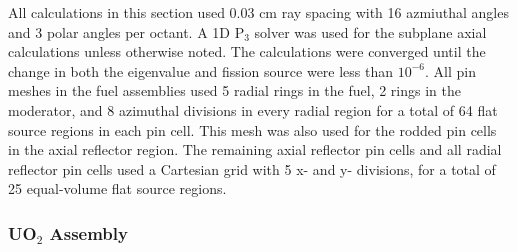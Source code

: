 All calculations in this section used 0.03 cm ray spacing with 16 azmiuthal angles and 3 polar angles per octant.  A 1D P$_3$ solver was used for the subplane axial calculations unless otherwise noted.  The calculations were converged until the change in both the eigenvalue and fission source were less than $10^{-6}$.  All pin meshes in the fuel assemblies used 5 radial rings in the fuel, 2 rings in the moderator, and 8 azimuthal divisions in every radial region for a total of 64 flat source regions in each pin cell.  This mesh was also used for the rodded pin cells in the axial reflector region.  The remaining axial reflector pin cells and all radial reflector pin cells used a Cartesian grid with 5 x- and y- divisions, for a total of 25 equal-volume flat source regions.

\subsubsection{UO\texorpdfstring{$_2$}{2} Assembly}


